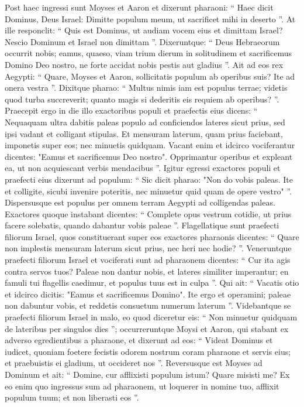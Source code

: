 \begin{biblechapter}
\begin{biblechapter}
\begin{biblechapter}
\begin{biblechapter}
\begin{biblechapter}
\verse Post haec ingressi sunt Moyses et Aaron et dixerunt pharaoni: “ Haec dicit Dominus, Deus Israel: Dimitte populum meum, ut sacrificet mihi in deserto ”. 
\verse At ille responclit: “ Quis est Dominus, ut audiam vocem eius et dimittam Israel? Nescio Dominum et Israel non dimittam ”. 
\verse Dixeruntque: “ Deus Hebraeorum occurrit nobis; eamus, quaeso, viam trium dierum in solitudinem et sacrificemus Domino Deo nostro, ne forte accidat nobis pestis aut gladius ”. 
\verse Ait ad eos rex Aegypti: “ Quare, Moyses et Aaron, sollicitatis populum ab operibus suis? Ite ad onera vestra ”. 
\verse Dixitque pharao: “ Multus nimis iam est populus terrae; videtis quod turba succreverit; quanto magis si dederitis eis requiem ab operibus? ”.
 \verse Praecepit ergo in die illo exactoribus populi et praefectis eius dicens: 
\verse “ Nequaquam ultra dabitis paleas populo ad conficiendos lateres sicut prius, sed ipsi vadant et colligant stipulas. 
\verse Et mensuram laterum, quam prius faciebant, imponetis super eos; nec minuetis quidquam. Vacant enim et idcirco vociferantur dicentes: "Eamus et sacrificemus Deo nostro". 
\verse Opprimantur operibus et expleant ea, ut non acquiescant verbis mendacibus ”.
 \verse Igitur egressi exactores populi et praefecti eius dixerunt ad populum: “ Sic dicit pharao: "Non do vobis paleas. 
\verse Ite et colligite, sicubi invenire poteritis, nec minuetur quid quam de opere vestro" ”. 
\verse Dispersusque est populus per omnem terram Aegypti ad colligendas paleas. 
\verse Exactores quoque instabant dicentes: “ Complete opus vestrum cotidie, ut prius facere solebatis, quando dabantur vobis paleae ”. 
\verse Flagellatique sunt praefecti filiorum Israel, quos constituerant super eos exactores pharaonis dicentes: “ Quare non implestis mensuram laterum sicut prius, nec heri nec hodie? ”.
 \verse Veneruntque praefecti filiorum Israel et vociferati sunt ad pharaonem dicentes: “ Cur ita agis contra servos tuos? 
\verse Paleae non dantur nobis, et lateres similiter imperantur; en famuli tui flagellis caedimur, et populus tuus est in culpa ”. 
\verse Qui ait: “ Vacatis otio et idcirco dicitis: "Eamus et sacrificemus Domino". 
\verse Ite ergo et operamini; paleae non dabuntur vobis, et reddetis consuetum numerum laterum ”.
 \verse Videbantque se praefecti filiorum Israel in malo, eo quod diceretur eis: “ Non minuetur quidquam de lateribus per singulos dies ”; 
\verse occurreruntque Moysi et Aaron, qui stabant ex adverso egredientibus a pharaone, 
\verse et dixerunt ad eos: “ Videat Dominus et iudicet, quoniam foetere fecistis odorem nostrum coram pharaone et servis eius; et praebuistis ei gladium, ut occideret nos ”. 
\verse Reversusque est Moyses ad Dominum et ait: “ Domine, cur afflixisti populum istum? Quare misisti me? 
\verse Ex eo enim quo ingressus sum ad pharaonem, ut loquerer in nomine tuo, afflixit populum tuum; et non liberasti eos ”.
 

\end{biblechapter}
\end{biblechapter}
\end{biblechapter}
\end{biblechapter}
\end{biblechapter}
